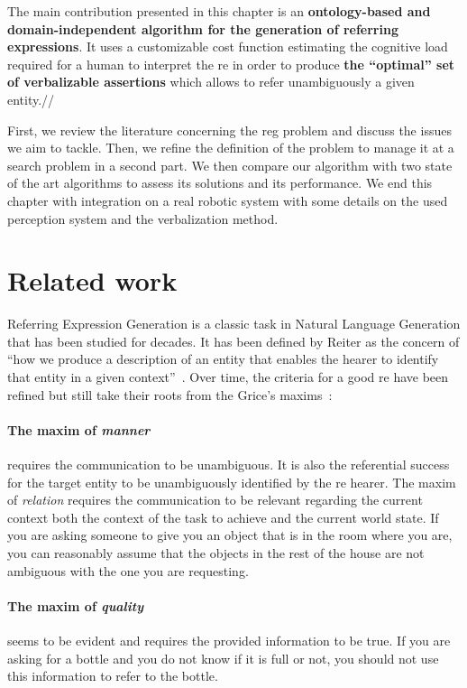The main contribution presented in this chapter is an \textbf{ontology-based and domain-independent algorithm for the generation of referring expressions}. It uses a customizable cost function estimating the cognitive load required for a human to interpret the \acrshort{re} in order to produce \textbf{the ``optimal'' set of verbalizable assertions} which allows to refer unambiguously a given entity.//

First, we review the literature concerning the \acrshort{reg} problem and discuss the issues we aim to tackle. Then, we refine the definition of the problem to manage it at a search problem in a second part. We then compare our algorithm with two state of the art algorithms to assess its solutions and its performance. We end this chapter with integration on a real robotic system with some details on the used perception system and the verbalization method.

\section{Related work}

Referring Expression Generation is a classic task in Natural Language Generation \cite{gatt_2018_survey} that has been studied for decades. It has been defined by Reiter as the concern of ``how we produce a description of an entity that enables the hearer to identify that entity in a given context''~\cite{reiter_2000_building}. Over time, the criteria for a good \acrfull{re} have been refined but still take their roots from the Grice's maxims~\cite{grice_1975_logic}:

\paragraph{The maxim of \textit{manner}} requires the communication to be unambiguous. It is also the referential success for the target entity to be unambiguously identified by the \acrshort{re} hearer. The maxim of \textit{relation} requires the communication to be relevant regarding the current context both the context of the task to achieve and the current world state. If you are asking someone to give you an object that is in the room where you are, you can reasonably assume that the objects in the rest of the house are not ambiguous with the one you are requesting. 

\paragraph{The maxim of \textit{quality}} seems to be evident and requires the provided information to be true. If you are asking for a bottle and you do not know if it is full or not, you should not use this information to refer to the bottle. 

